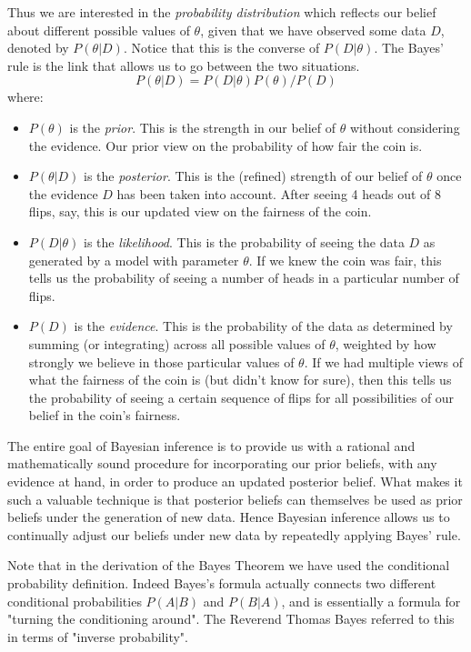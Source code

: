 Thus we are interested in the \emph{probability distribution} which reflects our belief about different possible values of $\theta$, given that we have observed some data $D$, denoted by $P(\theta|D)$. Notice that this is the converse of $P(D|\theta)$. The Bayes' rule is the link that allows us to go between the two situations.
\begin{equation}
  P(\theta|D) = P(D|\theta)P(\theta)/P(D)
\end{equation}
where:
\begin{itemize}
\item $P(\theta)$ is the \emph{prior}. This is the strength in our belief of $\theta$ without considering the evidence. Our prior view on the probability of how fair the coin is.
\item $P(\theta|D)$ is the \emph{posterior}. This is the (refined) strength of our belief of $\theta$ once the evidence $D$ has been taken into account. After seeing 4 heads out of 8 flips, say, this is our updated view on the fairness of the coin.
\item $P(D|\theta)$ is the \emph{likelihood}. This is the probability of seeing the data $D$ as generated by a model with parameter $\theta$. If we knew the coin was fair, this tells us the probability of seeing a number of heads in a particular number of flips.
\item $P(D)$ is the \emph{evidence}. This is the probability of the data as determined by summing (or integrating) across all possible values of $\theta$, weighted by how strongly we believe in those particular values of $\theta$. If we had multiple views of what the fairness of the coin is (but didn't know for sure), then this tells us the probability of seeing a certain sequence of flips for all possibilities of our belief in the coin's fairness.
\end{itemize}

The entire goal of Bayesian inference is to provide us with a rational and mathematically sound procedure for incorporating our prior beliefs, with any evidence at hand, in order to produce an updated posterior belief. What makes it such a valuable technique is that posterior beliefs can themselves be used as prior beliefs under the generation of new data. Hence Bayesian inference allows us to continually adjust our beliefs under new data by repeatedly applying Bayes' rule.

Note that in the derivation of the Bayes Theorem we have used the conditional probability definition. Indeed Bayes's formula actually connects two different conditional probabilities $P(A|B)$ and $P(B|A)$, and is essentially a formula for "turning the conditioning around". The Reverend Thomas Bayes referred to this in terms of "inverse probability".

